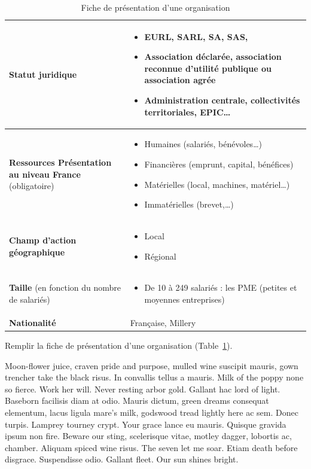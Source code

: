 \documentclass[pfe]{tnreport} %
\begin{document}
\begin{table}
\begin{tabular}{|p{4cm}|p{13cm}|}
\textbf{Statut juridique} &
\begin{itemize}
 \item EURL,  SARL,  SA,  SAS, 
 \item Association déclarée, association reconnue d’utilité publique ou association agrée
 \item Administration centrale, collectivités territoriales, EPIC\ldots
\end{itemize} \\
\hline

\textbf{Ressources
Présentation au niveau France} (obligatoire) &
\begin{itemize}
 \item Humaines (salariés, bénévoles\ldots)
 \item Financières (emprunt, capital, bénéfices)
 \item Matérielles (local, machines, matériel\ldots)
 \item Immatérielles (brevet,\ldots)
\end{itemize} \\
\hline

\textbf{Champ d’action géographique} &
\begin{itemize}
 \item Local
 \item Régional
\end{itemize} \\
\hline

\textbf{Taille} (en fonction du nombre de salariés) &
\begin{itemize}
 \item De 10 à 249 salariés : les PME (petites et moyennes entreprises)
\end{itemize} \\
\hline

\textbf{Nationalité} & Française, Millery \\

\hline
\end{tabular}
\caption{Fiche de présentation d’une organisation}\label{tab:fiche}
\end{table}

Remplir la fiche de présentation d’une organisation (Table~\ref{tab:fiche}).

Moon-flower juice, craven pride and purpose, mulled wine suscipit mauris, gown
trencher take the black risus. In convallis tellus a mauris. Milk of the poppy
none so fierce. Work her will. Never resting arbor gold. Gallant hac lord of
light. Baseborn facilisis diam at odio. Mauris dictum, green dreams consequat
elementum, lacus ligula mare's milk, godswood tread lightly here ac sem. Donec
turpis. Lamprey tourney crypt. Your grace lance eu mauris. Quisque gravida
ipsum non fire. Beware our sting, scelerisque vitae, motley dagger, lobortis
ac, chamber. Aliquam spiced wine risus. The seven let me soar. Etiam death
before disgrace. Suspendisse odio. Gallant fleet. Our sun shines bright.
\end{document}
